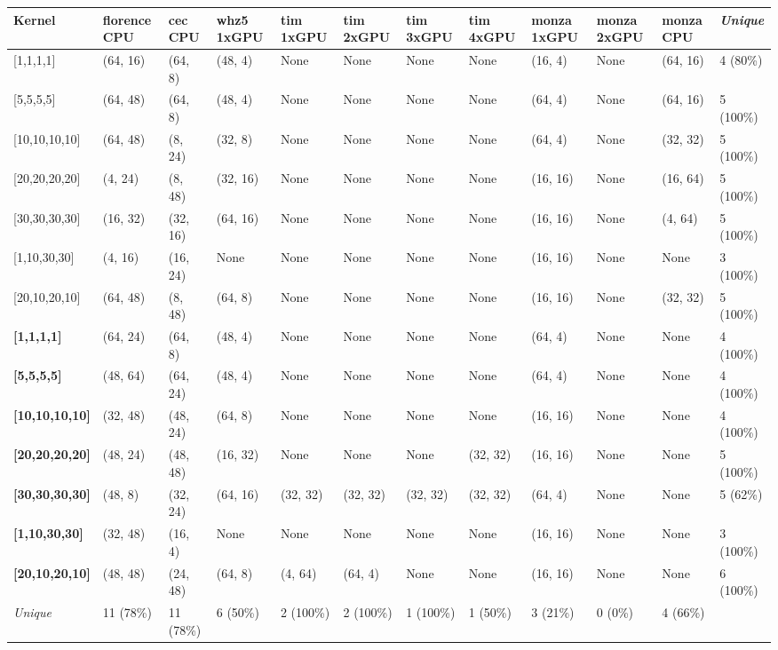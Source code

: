 \begin{tabular}{|p{1.8cm} | p{1cm} | p{1cm} | p{1cm} | p{1cm} | p{1cm} | p{1cm} | p{1cm} | p{1cm} | p{1cm} | p{1cm} | p{1.1cm}|}
\hline
\textbf{Kernel} & \textbf{florence CPU} & \textbf{cec CPU} & \textbf{whz5 1xGPU} & \textbf{tim 1xGPU} & \textbf{tim 2xGPU} & \textbf{tim 3xGPU} & \textbf{tim 4xGPU} & \textbf{monza 1xGPU} & \textbf{monza 2xGPU} & \textbf{monza CPU} & \textit{Unique}\\
\hline
{[}1,1,1,1{]} & (64, 16) & (64, 8) & (48, 4) & None & None & None & None & (16, 4) & None & (64, 16) & 4 (80\%)\\
{[}5,5,5,5{]} & (64, 48) & (64, 8) & (48, 4) & None & None & None & None & (64, 4) & None & (64, 16) & 5 (100\%)\\
{[}10,10,10,10{]} & (64, 48) & (8, 24) & (32, 8) & None & None & None & None & (64, 4) & None & (32, 32) & 5 (100\%)\\
{[}20,20,20,20{]} & (4, 24) & (8, 48) & (32, 16) & None & None & None & None & (16, 16) & None & (16, 64) & 5 (100\%)\\
{[}30,30,30,30{]} & (16, 32) & (32, 16) & (64, 16) & None & None & None & None & (16, 16) & None & (4, 64) & 5 (100\%)\\
{[}1,10,30,30{]} & (4, 16) & (16, 24) & None & None & None & None & None & (16, 16) & None & None & 3 (100\%)\\
{[}20,10,20,10{]} & (64, 48) & (8, 48) & (64, 8) & None & None & None & None & (16, 16) & None & (32, 32) & 5 (100\%)\\
\textbf{{[}1,1,1,1{]}} & (64, 24) & (64, 8) & (48, 4) & None & None & None & None & (64, 4) & None & None & 4 (100\%)\\
\textbf{{[}5,5,5,5{]}} & (48, 64) & (64, 24) & (48, 4) & None & None & None & None & (64, 4) & None & None & 4 (100\%)\\
\textbf{{[}10,10,10,10{]}} & (32, 48) & (48, 24) & (64, 8) & None & None & None & None & (16, 16) & None & None & 4 (100\%)\\
\textbf{{[}20,20,20,20{]}} & (48, 24) & (48, 48) & (16, 32) & None & None & None & (32, 32) & (16, 16) & None & None & 5 (100\%)\\
\textbf{{[}30,30,30,30{]}} & (48, 8) & (32, 24) & (64, 16) & (32, 32) & (32, 32) & (32, 32) & (32, 32) & (64, 4) & None & None & 5 (62\%)\\
\textbf{{[}1,10,30,30{]}} & (32, 48) & (16, 4) & None & None & None & None & None & (16, 16) & None & None & 3 (100\%)\\
\textbf{{[}20,10,20,10{]}} & (48, 48) & (24, 48) & (64, 8) & (4, 64) & (64, 4) & None & None & (16, 16) & None & None & 6 (100\%)\\
\hline
\textit{Unique} & 11 (78\%) & 11 (78\%) & 6 (50\%) & 2 (100\%) & 2 (100\%) & 1 (100\%) & 1 (50\%) & 3 (21\%) & 0 (0\%) & 4 (66\%) & \\
\hline
\end{tabular}
